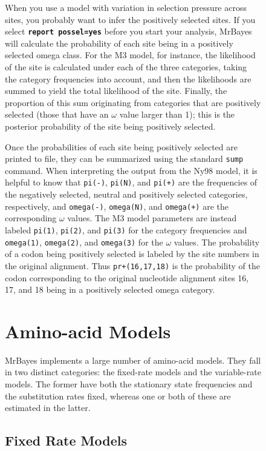 \documentclass[12pt]{book}
\newcommand{\ttt}[1]{\texttt{#1}}
\newcommand{\tb}[1]{\ttt{\textbf{#1}}}
\begin{document}
\begin{figure}[h]
When you use a model with variation in selection pressure across sites, you probably want to infer
the positively selected sites. If you select \tb{report possel=yes} before you start your analysis,
MrBayes will calculate the probability of each site being in a positively selected omega class. For
the M3 model, for instance, the likelihood of the site is calculated under each of the three
categories, taking the category frequencies into account, and then the likelihoods are summed to
yield the total likelihood of the site. Finally, the proportion of this sum originating from
categories that are positively selected (those that have an $\omega$ value larger than 1); this is
the posterior probability of the site being positively selected.

Once the probabilities of each site being positively selected are printed to file, they can be
summarized using the standard \ttt{sump} command. When interpreting the output from the Ny98 model,
it is helpful to know that \ttt{pi(-)}, \ttt{pi(N)}, and \ttt{pi(+)} are the frequencies of the
negatively selected, neutral and positively selected categories, respectively, and \ttt{omega(-)},
\ttt{omega(N)}, and \ttt{omega(+)} are the corresponding $\omega$ values. The M3 model parameters
are instead labeled \ttt{pi(1)}, \ttt{pi(2)}, and \ttt{pi(3)} for the category frequencies and
\ttt{omega(1)}, \ttt{omega(2)}, and \ttt{omega(3)} for the $\omega$ values. The probability of a
codon being positively selected is labeled by the site numbers in the original alignment. Thus
\ttt{pr+(16,17,18)} is the probability of the codon corresponding to the original nucleotide
alignment sites 16, 17, and 18 being in a positively selected omega category.

\section{Amino-acid Models}
\label{amino-acidModels}

MrBayes implements a large number of amino-acid models. They fall in two distinct categories: the
fixed-rate models and the variable-rate models. The former have both the stationary state
frequencies and the substitution rates fixed, whereas one or both of these are estimated in the
latter.

\subsection{Fixed Rate Models}


\end{figure}
\end{document}
